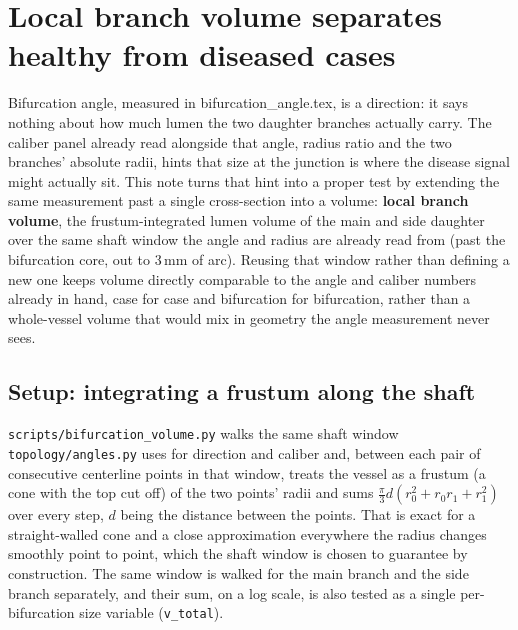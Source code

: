
\section*{Local branch volume separates healthy from diseased cases}

Bifurcation angle, measured in bifurcation\_angle.tex, is a direction: it says nothing about how
much lumen the two daughter branches actually carry. The caliber panel already read alongside that
angle, radius ratio and the two branches' absolute radii, hints that size at the junction is where
the disease signal might actually sit. This note turns that hint into a proper test by extending
the same measurement past a single cross-section into a volume: \textbf{local branch volume}, the
frustum-integrated lumen volume of the main and side daughter over the same shaft window the angle
and radius are already read from (past the bifurcation core, out to 3\,mm of arc). Reusing that
window rather than defining a new one keeps volume directly comparable to the angle and caliber
numbers already in hand, case for case and bifurcation for bifurcation, rather than a whole-vessel
volume that would mix in geometry the angle measurement never sees.

\subsection*{Setup: integrating a frustum along the shaft}

\texttt{scripts/bifurcation\_volume.py} walks the same shaft window \texttt{topology/angles.py}
uses for direction and caliber and, between each pair of consecutive centerline points in that
window, treats the vessel as a frustum (a cone with the top cut off) of the two points' radii and
sums $\frac{\pi}{3} d (r_0^2 + r_0 r_1 + r_1^2)$ over every step, $d$ being the distance between the
points. That is exact for a straight-walled cone and a close approximation everywhere the radius
changes smoothly point to point, which the shaft window is chosen to guarantee by construction. The
same window is walked for the main branch and the side branch separately, and their sum, on a log
scale, is also tested as a single per-bifurcation size variable (\texttt{v\_total}).

